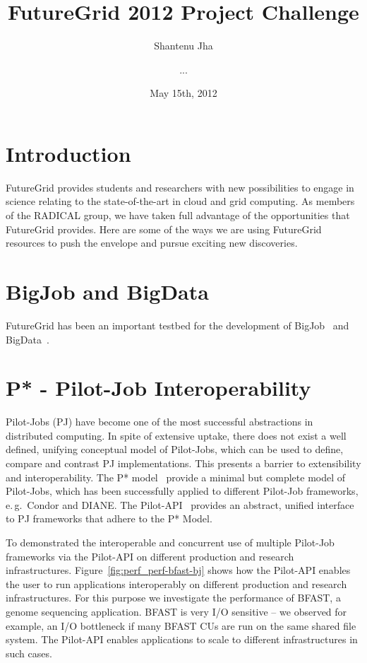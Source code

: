 \documentclass[]{paper}
\begin{document}
\title{FutureGrid 2012 Project Challenge} 
\author{Shantenu Jha 
  \and ...
}
\date{May 15th, 2012}
\maketitle

\begin{abstract}
\end{abstract}

\section{Introduction}
FutureGrid provides students and researchers with new possibilities to
engage in science relating to the state-of-the-art in cloud and grid computing.
As members of the RADICAL group, we have taken full advantage
of the opportunities that FutureGrid provides.  Here are some of the ways
we are using FutureGrid resources to push the envelope and pursue exciting
new discoveries.

\section{BigJob and BigData}

FutureGrid has been an important testbed for the development of 
BigJob~\cite{saga_bigjob_condor_cloud} and BigData~\cite{pstar-sc-2012,pmr-2012}.


\section{P* - Pilot-Job Interoperability}

Pilot-Jobs (PJ) have become one of the most successful abstractions in
distributed computing. In spite of extensive uptake, there does not exist a
well defined, unifying conceptual model of Pilot-Jobs, which can be used to
define, compare and contrast PJ implementations. This presents a barrier to
extensibility and interoperability. The P*
model~\cite{pstar-2012,pstar-sc-2012} provide a minimal but complete model of
Pilot-Jobs, which has been successfully applied to different Pilot-Job
frameworks, e.\,g.\ Condor and DIANE. The Pilot-API~\cite{pilot_api} provides 
an abstract, unified interface to PJ frameworks that adhere to the P* Model.

To demonstrated the interoperable and concurrent use of multiple Pilot-Job
frameworks via the Pilot-API on different production and research
infrastructures. Figure~\ref{fig:perf_perf-bfast-bj} shows how the Pilot-API
enables the user to run applications interoperably on different production and
research infrastructures. For this purpose we investigate the performance of
BFAST, a genome sequencing application. BFAST is very I/O sensitive -- we
observed for example, an I/O bottleneck if many BFAST CUs are run on the same
shared file system. The Pilot-API enables applications to scale to different
infrastructures in such cases.
\end{document}
